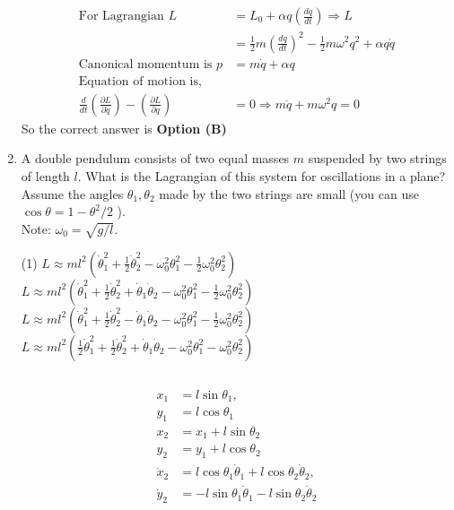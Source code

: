 \begin{enumerate}
\begin{answer}
\begin{align*}
\text{For Lagrangian }L&=L_{0}+\alpha q\left(\frac{d q}{d t}\right) \Rightarrow L\\&=\frac{1}{2} m\left(\frac{d q}{d t}\right)^{2}-\frac{1}{2} m \omega^{2} q^{2}+\alpha q \dot{q}\\
\text{Canonical momentum is }p&=m \dot{q}+\alpha q\\
\text{Equation of motion is,}\\
\frac{d}{d t}\left(\frac{\partial L}{\partial \dot{q}}\right)-\left(\frac{\partial L}{\partial q}\right)&=0 \Rightarrow m \ddot{q}+m \omega^{2} q=0
\end{align*}
So the correct answer is \textbf{Option (B)}
\end{answer}
\item  A double pendulum consists of two equal masses $m$ suspended by two strings of length $l$. What is the Lagrangian of this system for oscillations in a plane? Assume the angles $\theta_{1}, \theta_{2}$ made by the two strings are small (you can use $\cos \theta=1-\theta^{2} / 2$ ).\\
Note: $\omega_{0}=\sqrt{g / l}$.
{}
\begin{tasks}(1)
\task[\textbf{A.}] $L \approx m l^{2}\left(\dot{\theta}_{1}^{2}+\frac{1}{2} \dot{\theta}_{2}^{2}-\omega_{0}^{2} \theta_{1}^{2}-\frac{1}{2} \omega_{0}^{2} \theta_{2}^{2}\right)$
\task[\textbf{B.}]  $L \approx m l^{2}\left(\dot{\theta}_{1}^{2}+\frac{1}{2} \dot{\theta}_{2}^{2}+\dot{\theta}_{1} \dot{\theta}_{2}-\omega_{0}^{2} \theta_{1}^{2}-\frac{1}{2} \omega_{0}^{2} \theta_{2}^{2}\right)$
\task[\textbf{C.}] $L \approx m l^{2}\left(\dot{\theta}_{1}^{2}+\frac{1}{2} \dot{\theta}_{2}^{2}-\dot{\theta}_{1} \dot{\theta}_{2}-\omega_{0}^{2} \theta_{1}^{2}-\frac{1}{2} \omega_{0}^{2} \theta_{2}^{2}\right)$
\task[\textbf{D.}]  $L \approx m l^{2}\left(\frac{1}{2} \dot{\theta}_{1}^{2}+\frac{1}{2} \dot{\theta}_{2}^{2}+\dot{\theta}_{1} \dot{\theta}_{2}-\omega_{0}^{2} \theta_{1}^{2}-\omega_{0}^{2} \theta_{2}^{2}\right)$
\end{tasks}
\begin{answer}$\left. \right. $\\
\begin{minipage}{0.45\textwidth}
	\begin{align*}
	x_{1}&=l \sin \theta_{1},\\ y_{1}&=l \cos \theta_{1}\\
	x_{2}&=x_{1}+l \sin \theta_{2}\\y_{2}&=y_{1}+l \cos \theta_{2}\\
	\dot{x}_{2}&=l \cos \theta_{1} \dot{\theta}_{1}+l \cos \theta_{2} \dot{\theta}_{2},\\ \dot{y}_{2}&=-l \sin \theta_{1} \dot{\theta}_{1}-l \sin \theta_{2} \dot{\theta}_{2}\\

\end{align*}
\end{minipage}
\end{answer}
\end{enumerate}
